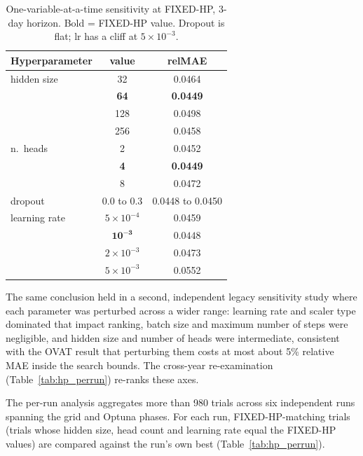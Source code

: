 \documentclass[twocolumn,twoside,a4paper,10pt]{IEEEtran}
\begin{document}
\begin{table}[!ht]
    \caption{One-variable-at-a-time sensitivity at FIXED-HP, 3-day horizon. Bold = FIXED-HP value. Dropout is flat; lr has a cliff at $5\!\times\!10^{-3}$.}
    \label{tab:ovat}
    \begin{center}
    \footnotesize
    \begin{tabular}{lcc}
        \toprule
        Hyperparameter & value & relMAE \\
        \midrule
        hidden size  & 32                   & 0.0464 \\
                     & \textbf{64}          & \textbf{0.0449} \\
                     & 128                  & 0.0498 \\
                     & 256                  & 0.0458 \\
        \midrule
        n.\ heads    & 2                    & 0.0452 \\
                     & \textbf{4}           & \textbf{0.0449} \\
                     & 8                    & 0.0472 \\
        \midrule
        dropout      & 0.0 to 0.3           & 0.0448 to 0.0450 \\
        \midrule
        learning rate & $5\!\times\!10^{-4}$ & 0.0459 \\
                      & $\boldsymbol{10^{-3}}$ & $\boldsymbol{0.0448}$ \\
                      & $2\!\times\!10^{-3}$ & 0.0473 \\
                      & $5\!\times\!10^{-3}$ & 0.0552 \\
        \bottomrule
    \end{tabular}
    \end{center}
\end{table}

The same conclusion held in a second, independent legacy sensitivity study where each parameter was perturbed across a wider range: learning rate and scaler type dominated that impact ranking, batch size and maximum number of steps were negligible, and hidden size and number of heads were intermediate, consistent with the OVAT result that perturbing them costs at most about 5\% relative MAE inside the search bounds. The cross-year re-examination (Table~\ref{tab:hp_perrun}) re-ranks these axes.

The per-run analysis aggregates more than 980 trials across six independent runs spanning the grid and Optuna phases. For each run, FIXED-HP-matching trials (trials whose hidden size, head count and learning rate equal the FIXED-HP values) are compared against the run's own best (Table~\ref{tab:hp_perrun}).
\end{document}
